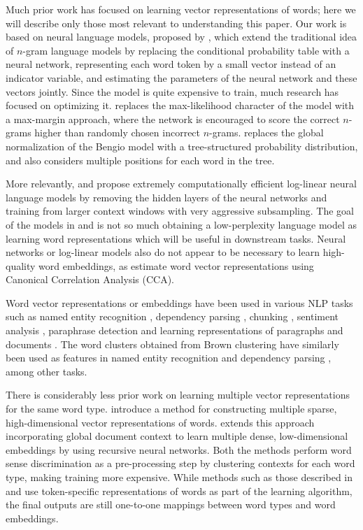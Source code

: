 \documentclass[11pt,a4paper]{article}
\begin{document}
Much prior work has focused on learning vector representations of
words; here we will describe only those most relevant to
understanding this paper. Our work is based on neural language models,
proposed by , which extend the traditional idea
of $n$-gram language models by replacing the conditional probability
table with a neural network, representing each word token by a small
vector instead of an indicator variable, and estimating the parameters
of the neural network and these vectors jointly. Since the
 model is quite expensive to train, much research
has focused on optimizing it.  replaces the
max-likelihood character of the model with a max-margin approach,
where the network is encouraged to score the correct $n$-grams higher
than randomly chosen incorrect $n$-grams.  replaces
the global normalization of the Bengio model with a tree-structured
probability distribution, and also considers multiple positions for
each word in the tree. 

More relevantly,  and
 propose extremely computationally efficient
log-linear neural language models by removing the hidden layers of the
neural networks and training from larger context windows with very
aggressive subsampling. The goal of the models in
 and  is not so much
obtaining a low-perplexity language model as learning word
representations which will be useful in downstream tasks. Neural
networks or log-linear models also do not appear to be necessary to
learn high-quality word embeddings, as  estimate
word vector representations using Canonical Correlation Analysis
(CCA). 

Word vector representations or embeddings have been used in various
NLP tasks such as named entity recognition
\cite{neelakantan:2014,passos:2014,turian:2010}, dependency parsing
\cite{bansal:2014}, chunking \cite{turian:2010,dhillon:2011},
sentiment analysis \cite{mass:2011}, paraphrase detection
\cite{socher:2011} and learning representations of paragraphs and
documents \cite{le:2014}. The word clusters obtained from Brown
clustering \cite{brown:1992} have similarly been used as features in
named entity recognition \cite{miller:2004,ratinov:2009} and
dependency parsing \cite{koo:2008}, among other tasks.

There is considerably less prior work on learning multiple vector
representations for the same word type. 
introduce a method for constructing multiple sparse, high-dimensional
vector representations of words.  extends this approach incorporating global document context to learn
multiple dense, low-dimensional embeddings by using recursive neural
networks.  Both the methods perform word sense discrimination as a
pre-processing step by clustering contexts for each word type, making
training more expensive.  While methods such as those described in
 and  use token-specific
representations of words as part of the learning algorithm, the final
outputs are still one-to-one mappings between word types and word
embeddings.
\end{document}
